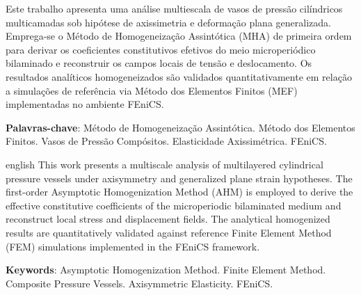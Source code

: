 \documentclass[
	12pt,				%
	openright,			%
	twoside,			%
	a4paper,			%
	english,			%
	brazilian			%
]{abntex2}
\begin{document}

\frenchspacing


\imprimircapa
\imprimirfolhaderosto

\setlength{\absparsep}{18pt}
\begin{resumo}
  Este trabalho apresenta uma análise multiescala de vasos de pressão cilíndricos multicamadas sob hipótese de axissimetria e deformação plana generalizada. Emprega-se o Método de Homogeneização Assintótica (MHA) de primeira ordem para derivar os coeficientes constitutivos efetivos do meio microperiódico bilaminado e reconstruir os campos locais de tensão e deslocamento. Os resultados analíticos homogeneizados são validados quantitativamente em relação a simulações de referência via Método dos Elementos Finitos (MEF) implementadas no ambiente FEniCS.

  \textbf{Palavras-chave}: Método de Homogeneização Assintótica. Método dos Elementos Finitos. Vasos de Pressão Compósitos. Elasticidade Axissimétrica. FEniCS.
\end{resumo}

\begin{resumo}[Abstract]
 \begin{otherlanguage*}{english}
   This work presents a multiscale analysis of multilayered cylindrical pressure vessels under axisymmetry and generalized plane strain hypotheses. The first-order Asymptotic Homogenization Method (AHM) is employed to derive the effective constitutive coefficients of the microperiodic bilaminated medium and reconstruct local stress and displacement fields. The analytical homogenized results are quantitatively validated against reference Finite Element Method (FEM) simulations implemented in the FEniCS framework.

   \textbf{Keywords}: Asymptotic Homogenization Method. Finite Element Method. Composite Pressure Vessels. Axisymmetric Elasticity. FEniCS.
 \end{otherlanguage*}
\end{resumo}

\tableofcontents*
\cleardoublepage

\listoffigures*
\cleardoublepage
\end{document}
